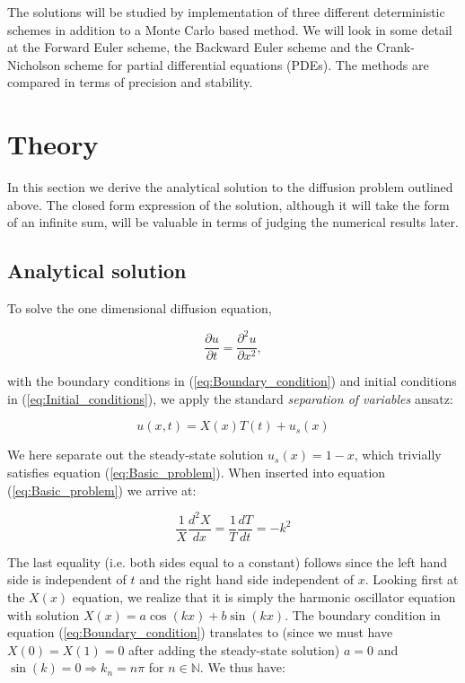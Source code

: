 \documentclass[a4paper, 11pt, notitlepage,english]{article}
\begin{document}
The solutions will be studied by implementation of three different deterministic schemes in addition to a Monte Carlo based method. We will look in some detail at the Forward Euler scheme, the Backward Euler scheme and the Crank-Nicholson scheme for partial differential equations (PDEs). The methods are compared in terms of precision and stability. 

\section{Theory}

In this section we derive the analytical solution to the diffusion problem outlined above. The closed form expression of the solution, although it will take the form of an infinite sum, will be valuable in terms of judging the numerical results later. 

\subsection{Analytical solution}
To solve the one dimensional diffusion equation, 

\begin{equation}
\frac{\partial u}{\partial t} = \frac{\partial^2 u}{\partial x^2},
\label{eq:Basic_problem}
\end{equation}

with the boundary conditions in (\ref{eq:Boundary_condition}) and initial conditions in (\ref{eq:Initial_conditions}), we apply the standard \emph{separation of variables} ansatz:

\begin{equation}
 u(x,t) = X(x)T(t) + u_s(x)
\label{eq:Separation of variables}
\end{equation}

We here separate out the steady-state solution $u_s(x) = 1-x$, which trivially satisfies equation (\ref{eq:Basic_problem}). When inserted into equation (\ref{eq:Basic_problem}) we arrive at:

\begin{equation}
\frac{1}{X} \frac{d^2 X}{dx} = \frac{1}{T}\frac{dT}{dt} = -k^2
\label{eq:Separated_equation}
\end{equation}

The last equality (i.e. both sides equal to a constant) follows since the left hand side is independent of $t$ and the right hand side independent of $x$. Looking first at the $X(x)$ equation, we realize that it is simply the harmonic oscillator equation with solution $X(x) = a\cos(kx) + b\sin(kx)$. The boundary condition in equation (\ref{eq:Boundary_condition}) translates to (since we must have $X(0) = X(1) = 0$ after adding the steady-state solution) $a = 0$ and $\sin(k) = 0 \Rightarrow k_n = n\pi$ for $n \in \mathbb{N}$. We thus have:
\end{document}
